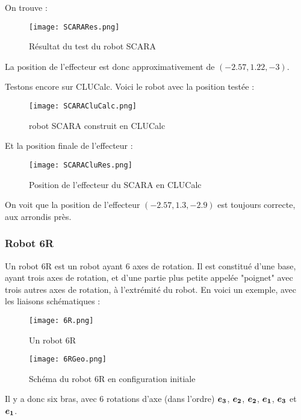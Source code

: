 On trouve : 

\begin{figure}[!ht]
\centering
\texttt{[image: SCARARes.png]}
\caption{Résultat du test du robot SCARA}
\end{figure}

La position de l'effecteur est donc approximativement de $(-2.57, 1.22, -3)$.

Testons encore sur CLUCalc. Voici le robot avec la position testée : 

\begin{figure}[!ht]
\centering
\texttt{[image: SCARACluCalc.png]}
\caption{robot SCARA construit en CLUCalc}
\end{figure}

Et la position finale de l'effecteur :

\begin{figure}[!ht]
\centering
\texttt{[image: SCARACluRes.png]}
\caption{Position de l'effecteur du SCARA en CLUCalc}
\end{figure}

On voit que la position de l'effecteur $(-2.57,1.3,-2.9)$ est toujours correcte, aux arrondis près. 

\subsubsection{Robot 6R }

Un robot 6R est un robot ayant 6 axes de rotation. Il est constitué d'une base, ayant trois axes de rotation, et d'une partie plus petite appelée "poignet" avec trois autres axes de rotation, à l'extrémité du robot. En voici un exemple, avec les liaisons schématiques : 

\begin{figure}[!ht]
    \begin{minipage}[c]{.46\linewidth}
        \centering
        \texttt{[image: 6R.png]}
        \caption{Un robot 6R}
    \end{minipage}
    \hfill%
    \begin{minipage}[c]{.46\linewidth}
        \centering
        \texttt{[image: 6RGeo.png]}
        \caption{Schéma du robot 6R en configuration initiale}
    \end{minipage}
\end{figure}


Il y a donc six bras, avec 6 rotations d'axe (dans l'ordre) $\bm{e_{3}}$, $\bm{e_{2}}$, $\bm{e_{2}}$, $\bm{e_{1}}$, $\bm{e_{3}}$ et $\bm{e_{1}}$. 

